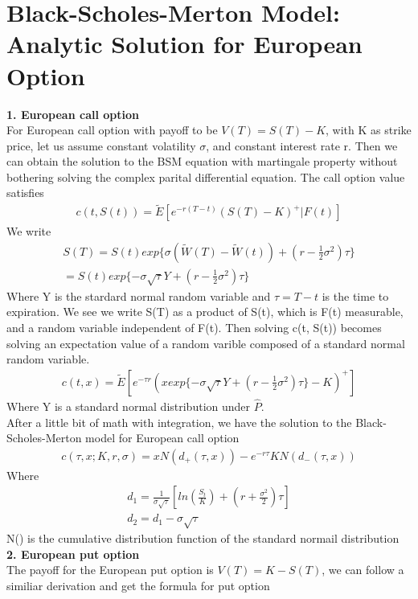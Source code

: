 \documentclass[a4paper]{article}
\begin{document}
\section{Black-Scholes-Merton Model: Analytic Solution for European Option}
{\bf1. European call option}\\
For European call option with payoff to be $V(T) = S(T) - K$, with K as strike price, let us assume constant volatility $\sigma$, and constant interest rate r. 
Then we can obtain the solution to the BSM equation with martingale property without bothering solving the complex parital
differential equation. The call option value satisfies
\begin{align*}
	c(t, S(t)) = \tilde E[e^{-r(T-t)}(S(T)-K)^+|F(t)]
\end{align*}
We write
\begin{align*}
	S(T) = S(t) exp\{\sigma(\tilde W(T) -\tilde W(t)) + (r - \frac{1}{2} \sigma^2) \tau\} \\
	     = S(t) exp\{-\sigma \sqrt{\tau} Y + (r - \frac{1}{2}\sigma^2)\tau\}
\end{align*}
Where Y is the stardard normal random variable and $\tau = T - t$ is the time to expiration. We see we write S(T) as a product of S(t), which is F(t) measurable, and a random variable independent of F(t).
Then solving c(t, S(t)) becomes solving an expectation value of a random varible composed of a standard normal random variable. 
\begin{align*}
	c(t,x) = \tilde E[e^{-\tau r}(x exp\{-\sigma \sqrt{\tau} Y + (r -\frac{1}{2}\sigma^2)\tau\}-K)^+]
\end{align*}
Where Y is a standard normal distribution under $\hat P$.\\
After a little bit of math with integration, we have the solution to the Black-Scholes-Merton model for European call option
\begin{align*}
	c(\tau,x; K,r,\sigma) = xN(d_{+}(\tau,x)) - e^{-r\tau}KN(d_{-}(\tau,x))
\end{align*}
Where
\begin{align*}
	d_1 = \frac{1}{\sigma \sqrt{\tau}}[ln(\frac{S_t}{K}) + (r+ \frac{\sigma^2}{2})\tau] \\
	d_2 = d_1 - \sigma \sqrt{\tau}
\end{align*}
N() is the cumulative distribution function of the standard normail distribution
{\bf 2. European put option}\\
The payoff for the European put option is $V(T) = K - S(T)$, we can follow a similiar derivation and get the formula for put option
\end{document}
